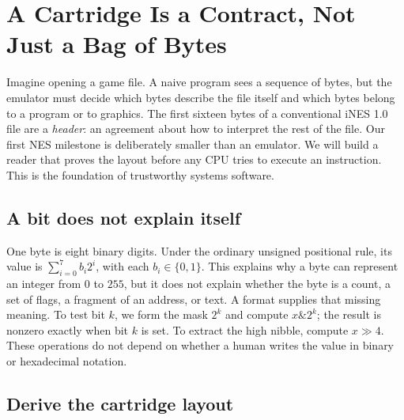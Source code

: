 \section{A Cartridge Is a Contract, Not Just a Bag of Bytes}
\label{sec:allmight-nes01}

Imagine opening a game file. A naive program sees a sequence of bytes, but the
emulator must decide which bytes describe the file itself and which bytes belong
to a program or to graphics. The first sixteen bytes of a conventional iNES
1.0 file are a \emph{header}: an agreement about how to interpret the rest of
the file. Our first NES milestone is deliberately smaller than an emulator.
We will build a reader that proves the layout before any CPU tries to execute
an instruction. This is the foundation of trustworthy systems software.

\subsection{A bit does not explain itself}

One byte is eight binary digits. Under the ordinary unsigned positional rule,
its value is $\sum_{i=0}^{7} b_i2^i$, with each $b_i\in\{0,1\}$. This
explains why a byte can represent an integer from $0$ to $255$, but it does
not explain whether the byte is a count, a set of flags, a fragment of an
address, or text. A format supplies that missing meaning. To test bit $k$,
we form the mask $2^k$ and compute $x\mathbin{\&}2^k$; the result is nonzero
exactly when bit $k$ is set. To extract the high nibble, compute $x\gg4$.
These operations do not depend on whether a human writes the value in binary
or hexadecimal notation.

\subsection{Derive the cartridge layout}

